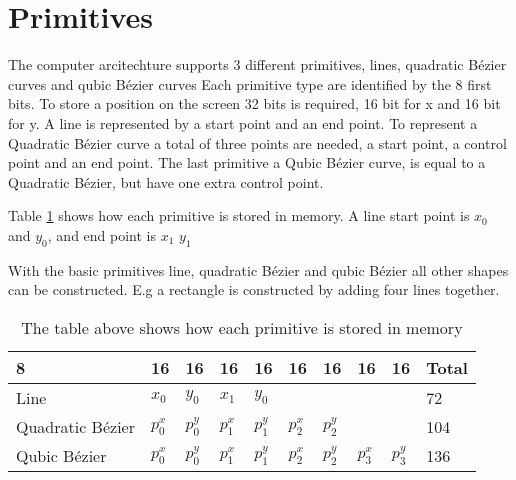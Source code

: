 \section{Primitives}
The computer arcitechture supports 3 different primitives, lines, quadratic Bézier curves and qubic Bézier curves
Each primitive type are identified by the 8 first bits.
To store a position on the screen 32 bits is required, 16 bit for x and 16 bit for y.
A line is represented by a start point and an end point.
To represent a Quadratic Bézier curve a total of three points are needed, a start point, a control point and an end point.
The last primitive a Qubic Bézier curve, is equal to a Quadratic Bézier, but have one extra control point.

Table \ref{tbl:primitives} shows how each primitive is stored in memory.
A line start point is \(x_0 \) and \(y_0 \), and end point is \(x_1 \) \(y_1 \)

With the basic primitives line, quadratic Bézier and qubic Bézier all other shapes can be constructed.
E.g a rectangle is constructed by adding four lines together.

\begin{table}[h]
    \label{tbl:primitives}
    \centering
    \begin{tabular}{|l|l|l|l|l|l|l|l|l|l|}
    \hline
    8                & 16  & 16  & 16  & 16  & 16  & 16  & 16  & 16  & Total \\ \hline
    Line             & \(x_0 \)  & \(y_0 \)  & \(x_1 \)  & \(y_0 \)  & ~   & ~   & ~   & ~   & 72    \\ \hline
    Quadratic Bézier & \(p_0^x \) & \(p_0^y \) & \(p_1^x \) & \(p_1^y \) & \(p_2^x \) & \(p_2^y \) & ~   & ~   & 104   \\ \hline
    Qubic Bézier     & \(p_0^x \) & \(p_0^y \) & \(p_1^x \) & \(p_1^y \) & \(p_2^x \) & \(p_2^y \) & \(p_3^x \) & \(p_3^y \) & 136   \\ \hline
    \end{tabular}
    \caption{The table above shows how each primitive is stored in memory}
\end{table}

